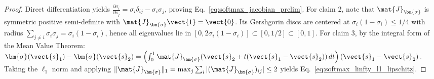\begin{proof}
Direct differentiation yields $\frac{\partial \sigma_i}{\partial s_j} = \sigma_i \delta_{ij} - \sigma_i \sigma_j$, proving Eq.~\eqref{eq:softmax_jacobian_prelim}.
For claim 2, note that $\mat{J}_{\bm{\sigma}}$ is symmetric positive semi-definite with $\mat{J}_{\bm{\sigma}} \vect{1} = \vect{0}$. Its Gershgorin discs are centered at $\sigma_i(1 - \sigma_i) \le 1/4$ with radius $\sum_{j \ne i} \sigma_i \sigma_j = \sigma_i(1 - \sigma_i)$, hence all eigenvalues lie in $[0, 2\sigma_i(1 - \sigma_i)] \subset [0, 1/2] \subset [0, 1]$.
For claim 3, by the integral form of the Mean Value Theorem:
$\bm{\sigma}(\vect{s}_1) - \bm{\sigma}(\vect{s}_2) = \left( \int_0^1 \mat{J}_{\bm{\sigma}}(\vect{s}_2 + t(\vect{s}_1 - \vect{s}_2)) \, dt \right) (\vect{s}_1 - \vect{s}_2)$.
Taking the $\ell_1$ norm and applying $\|\mat{J}_{\bm{\sigma}}\|_1 = \max_j \sum_i |(\mat{J}_{\bm{\sigma}})_{ij}| \le 2$ yields Eq.~\eqref{eq:softmax_linfty_l1_lipschitz}.
\end{proof}

